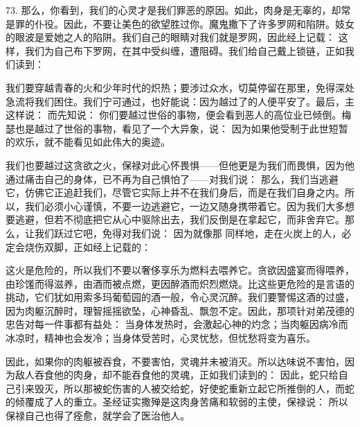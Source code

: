 73. 那么，你看到，我们的心灵才是我们罪恶的原因。如此，肉身是无辜的，却常是罪的仆役。因此，不要让美色的欲望胜过你。魔鬼撒下了许多罗网和陷阱。妓女的眼波是爱她之人的陷阱。我们自己的眼睛对我们就是罗网，因此经上记载：  这样，我们为自己布下罗网，在其中受纠缠，遭阻碍。我们给自己戴上锁链，正如我们读到：\par

我们要穿越青春的火和少年时代的炽热；要涉过众水，切莫停留在那里，免得深处急流将我们困住。我们宁可通过，也好能说：因为越过了的人便平安了。最后，主这样说： 而先知说： 你们要越过世俗的事物，便会看到恶人的高位业已倾倒。梅瑟也是越过了世俗的事物，看见了一个大异象，说： 因为如果他受制于此世短暂的欢乐，就不能看见如此伟大的奥迹。\par

我们也要越过这贪欲之火，保禄对此心怀畏惧——但他更是为我们而畏惧，因为他通过痛击自己的身体，已不再为自己惧怕了——对我们说： 那么，我们当逃避它，仿佛它正追赶我们，尽管它实际上并不在我们身后，而是在我们自身之内。所以，我们必须小心谨慎，不要一边逃避它，一边又随身携带着它。因为我们大多想要逃避，但若不彻底把它从心中驱除出去，我们反倒是在拿起它，而非舍弃它。那么，让我们跃过它吧，免得对我们说： 因为就像那  同样地，走在火炭上的人，必定会烧伤双脚，正如经上记载的：\par

这火是危险的，所以我们不要以奢侈享乐为燃料去喂养它。贪欲因盛宴而得喂养，由珍馐而得滋养，由酒而被点燃，更因醉酒而炽烈燃烧。比这些更危险的是言语的挑动，它们犹如用索多玛葡萄园的酒一般，令心灵沉醉。我们要警惕这酒的过盛，因为肉躯沉醉时，理智摇摇欲坠，心神昏乱、飘忽不定。因此，那项针对弟茂德的忠告对每一件事都有益处： 当身体发热时，会激起心神的灼念；当肉躯因病冷而冰凉时，精神也会发冷；当身体受苦时，心灵忧愁，但忧愁将变为喜乐。\par

因此，如果你的肉躯被吞食，不要害怕，灵魂并未被消灭。所以达味说不害怕，因为敌人吞食他的肉身，却不能吞食他的灵魂，正如我们读到的： 因此，蛇只给自己引来毁灭，所以那被蛇伤害的人被交给蛇，好使蛇重新立起它所推倒的人，而蛇的倾覆成了人的重立。圣经证实撒殚是这肉身苦痛和软弱的主使，保禄说： 所以保禄自己也得了痊愈，就学会了医治他人。\par

